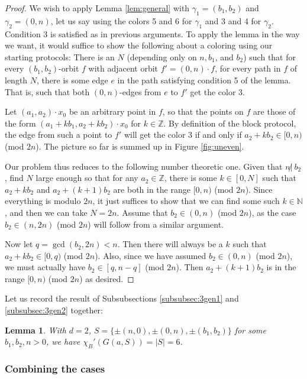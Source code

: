 \documentclass[10pt,a4paper]{article}
\newcommand{\0}{\varnothing}
\newcommand{\Z}{\mathbb{Z}}
\newcommand{\N}{\mathbb{N}}
\newtheorem{lemma}{Lemma}
\begin{document}
\begin{proof}
We wish to apply Lemma \ref{lem:general} with $\gamma_1 = (b_1,b_2)$ and $\gamma_2 = (0,n)$, let us say using the colors 5 and 6 for $\gamma_1$ and 3 and 4 for $\gamma_2$. Condition 3 is satisfied as in previous arguments. To apply the lemma in the way we want, it would suffice to show the following about a coloring using our starting protocols: There is an $N$ (depending only on $n,b_1$, and $b_2$) such that for every $(b_1,b_2)$-orbit $f$ with adjacent orbit $f' = (0,n) \cdot f$, for every path in $f$ of length $N$, there is some edge $e$ in the path satisfying condition 5 of the lemma. That is, such that both $(0,n)$-edges from $e$ to $f'$ get the color 3.

Let $(a_1,a_2) \cdot x_0$ be an arbitrary point in $f$, so that the points on $f$ are those of the form $(a_1 + kb_1,a_2+kb_2) \cdot x_0$ for $k \in \Z$. By definition of the block protocol, the edge from such a point to $f'$ will get the color 3 if and only if $a_2 + kb_2 \in [0,n)$ (mod $2n$). The picture so far is summed up in Figure \ref{fig:uneven}.

Our problem thus reduces to the following number theoretic one. Given that $n \not|\ b_2$, find $N$ large enough so that for any $a_2 \in \Z$, there is some $k \in [0,N]$ such that $a_2+kb_2$ and $a_2 + (k+1)b_2$ are both in the range $[0,n)$ (mod $2n$). Since everything is modulo $2n$, it just suffices to show that we can find some such $k \in \N$, and then we can take $N = 2n$. Assume that $b_2 \in (0,n)$ (mod $2n$), as the case $b_2 \in (n,2n)$ (mod $2n$) will follow from a similar argument.

Now let $q = \gcd(b_2,2n) < n$. Then there will always be a $k$ such that $a_2 + kb_2 \in [0,q)$ (mod $2n$). Also, since we have assumed $b_2 \in (0,n)$ (mod $2n$), we must actually have $b_2 \in [q,n-q]$ (mod $2n$). Then $a_2+(k+1)b_2$ is in the range $[0,n)$ (mod $2n$) as desired.
\end{proof}

Let us record the result of Subsubsections \ref{subsubsec:3gen1} and \ref{subsubsec:3gen2} together:

\begin{lemma}\label{lem:3gens}
With $d = 2$, $S = \{\pm(n,0),\pm(0,n),\pm(b_1,b_2)\}$ for some $b_1,b_2,n > 0$, we have $\chi_B'(G(a,S)) = |S| = 6$.
\end{lemma}

\subsubsection{Combining the cases}\label{subsubsec:2comb}
\end{document}
